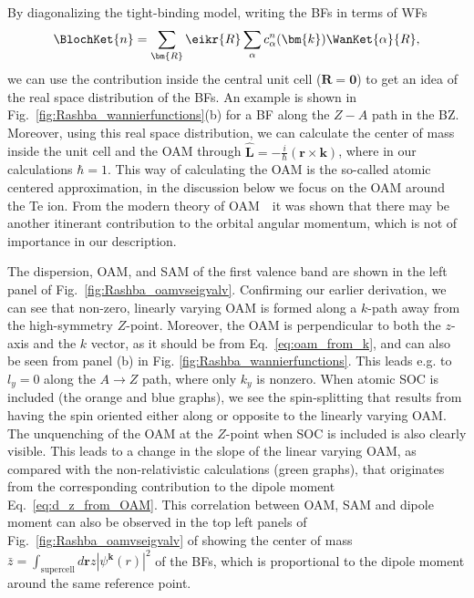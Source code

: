 By diagonalizing the tight-binding model, writing the BFs in terms of WFs
\begin{equation}
	\BlochKet{n} = \sum_{\bm{R}} \eikr{R} \sum_{\alpha} c_{\alpha}^n(\bm{k}) \WanKet{\alpha}{R},
\end{equation}
we can use the contribution inside the central unit cell ($\bm{R} = \bm{0}$) to get an idea of the real space distribution of the BFs.
An example is shown in Fig.~\ref{fig:Rashba_wannierfunctions}(b) for a BF along the $Z-A$ path in the BZ.
Moreover, using this real space distribution, we can calculate the center of mass inside the unit cell and the OAM through $\hat{\bm{L}} = -\frac{i}{\hbar} (\bm{r} \times \bm{k})$, where in our calculations $\hbar = 1$.
This way of calculating the OAM is the so-called atomic centered approximation, in the discussion below we focus on the OAM around the Te ion.
From the modern theory of OAM~\cite{Thonhauser2011}~it was shown that there may be another itinerant contribution to the orbital angular momentum, which is not of importance in our description. 

\begin{figure*}[h]
\centering
{}
\caption{\label{fig:Rashba_oamvseigvalv}{\bf Bloch function properties.} Comparison between the real-space observables and energy dispersion in (a) the first and (b) third valence band. The values are plotted in function of the relative distance from the $Z$ point $\bm{k}_r = \bm{k} - \bm{k}_Z$, towards the A and U points. The green graphs denote the values before turning on atomic SOC, whereas the orange and blue graphs denote the two spin-split bands.}
\end{figure*}

The dispersion, OAM, and SAM of the first valence band are shown in the left panel of Fig.~\ref{fig:Rashba_oamvseigvalv}. 
Confirming our earlier derivation, we can see that non-zero, linearly varying OAM is formed along a $k$-path away from the high-symmetry $Z$-point.
Moreover, the OAM is perpendicular to both the $z$-axis and the $k$ vector, as it should be from Eq.~\ref{eq:oam_from_k}, and can also be seen from panel (b) in Fig. \ref{fig:Rashba_wannierfunctions}.
This leads e.g. to $l_y=0$ along the $A \to Z$ path, where only $k_y$ is nonzero.
When atomic SOC is included (the orange and blue graphs), we see the spin-splitting that results from having the spin oriented either along or opposite to the linearly varying OAM.
The unquenching of the OAM at the $Z$-point when SOC is included is also clearly visible.
This leads to a change in the slope of the linear varying OAM, as compared with the non-relativistic calculations (green graphs), that originates from the corresponding contribution to the dipole moment Eq.~\ref{eq:d_z_from_OAM}.
This correlation between OAM, SAM and dipole moment can also be observed in the top left panels of Fig.~\ref{fig:Rashba_oamvseigvalv} of showing the center of mass $\bar{z}=\int_{\textrm{supercell}}d \bm{r} z |\psi^{\bm{k}}(r)|^2$ of the BFs, which is proportional to the dipole moment around the same reference point.

